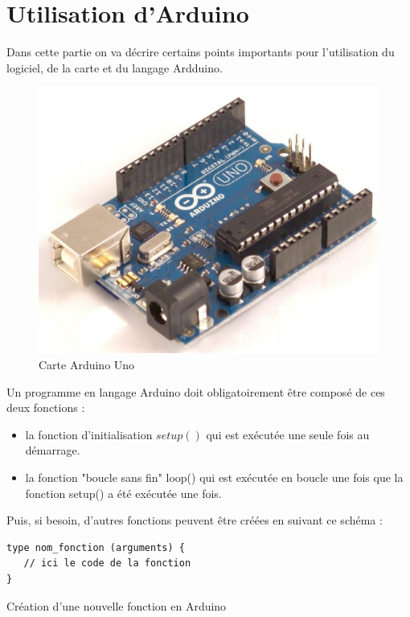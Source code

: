 \section{Utilisation d'Arduino}

  Dans cette partie on va décrire certains points importants pour l'utilisation du logiciel, de la carte et du langage Ardduino.

\begin{figure}[h]
\begin{center}
 \includegraphics[scale=0.4]{../images/Arduino/arduinoUno.png}
\caption{Carte Arduino Uno}
\end{center}
\end{figure}

Un programme en langage Arduino doit obligatoirement être composé de ces deux fonctions :
\begin{itemize}
 \item la fonction d'initialisation $setup()$ qui est exécutée une seule fois au démarrage.
 \item la fonction "boucle sans fin" loop() qui est exécutée en boucle une fois que la fonction setup() a été exécutée une fois.
\end{itemize}

Puis, si besoin, d'autres fonctions peuvent être créées en suivant ce schéma :
\begin{table}[h]
\begin{lstlisting}
type nom_fonction (arguments) {
   // ici le code de la fonction
}
\end{lstlisting}
\caption{Création d'une nouvelle fonction en Arduino}
\end{table}


